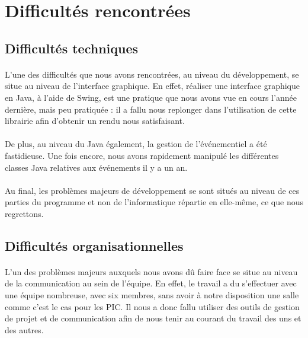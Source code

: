 \section{Difficultés rencontrées}

\subsection{Difficultés techniques}

\paragraph{}
L'une des difficultés que nous avons rencontrées, au niveau du développement, se situe au niveau de l'interface graphique. En effet, réaliser une interface graphique en Java, à l'aide de Swing, est une pratique que nous avons vue en cours l'année dernière, mais peu pratiquée : il a fallu nous replonger dans l'utilisation de cette librairie afin d'obtenir un rendu nous satisfaisant.

\paragraph{}
De plus, au niveau du Java également, la gestion de l'événementiel a été fastidieuse. Une fois encore, nous avons rapidement manipulé les différentes classes Java relatives aux événements il y a un an.

\paragraph{}
Au final, les problèmes majeurs de développement se sont situés au niveau de ces parties du programme et non de l'informatique répartie en elle-même, ce que nous regrettons.

\subsection{Difficultés organisationnelles}

\paragraph{}
L'un des problèmes majeurs auxquels nous avons dû faire face se situe au niveau de la communication au sein de l'équipe. En effet, le travail a du s'effectuer avec une équipe nombreuse, avec six membres, sans avoir à notre disposition une salle comme c'est le cas pour les PIC. Il nous a donc fallu utiliser des outils de gestion de projet et de communication afin de nous tenir au courant du travail des uns et des autres.

